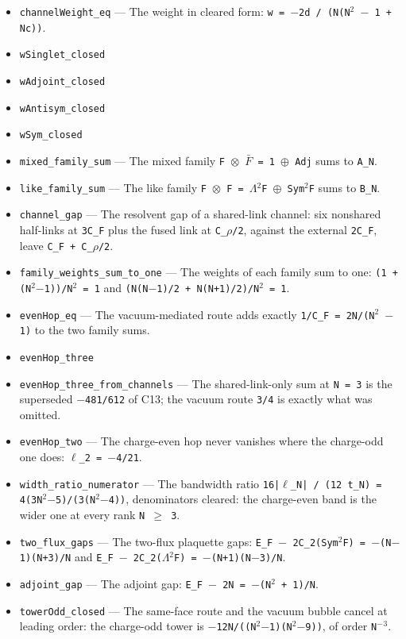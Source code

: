 \documentclass[11pt]{article}
\theoremstyle{plain}
\theoremstyle{definition}
\theoremstyle{remark}
\begin{document}
\begin{itemize}
\item \texttt{channelWeight\_eq} --- The weight in cleared form: \texttt{w = $-$2d / (N(N$^2$ $-$ 1 + Nc))}.
\item \texttt{wSinglet\_closed}
\item \texttt{wAdjoint\_closed}
\item \texttt{wAntisym\_closed}
\item \texttt{wSym\_closed}
\item \texttt{mixed\_family\_sum} --- The mixed family \texttt{F $\otimes$ $\bar F$ = 1 $\oplus$ Adj} sums to \texttt{A\_N}.
\item \texttt{like\_family\_sum} --- The like family \texttt{F $\otimes$ F = $\Lambda$$^2$F $\oplus$ Sym$^2$F} sums to \texttt{B\_N}.
\item \texttt{channel\_gap} --- The resolvent gap of a shared-link channel: six nonshared half-links at \texttt{3C\_F} plus the fused link at \texttt{C\_$\rho$/2}, against the external \texttt{2C\_F}, leave \texttt{C\_F + C\_$\rho$/2}.
\item \texttt{family\_weights\_sum\_to\_one} --- The weights of each family sum to one: \texttt{(1 + (N$^2$$-$1))/N$^2$ = 1} and \texttt{(N(N$-$1)/2 + N(N+1)/2)/N$^2$ = 1}.
\item \texttt{evenHop\_eq} --- The vacuum-mediated route adds exactly \texttt{1/C\_F = 2N/(N$^2$ $-$ 1)} to the two family sums.
\item \texttt{evenHop\_three}
\item \texttt{evenHop\_three\_from\_channels} --- The shared-link-only sum at \texttt{N = 3} is the superseded \texttt{$-$481/612} of C13; the vacuum route \texttt{3/4} is exactly what was omitted.
\item \texttt{evenHop\_two} --- The charge-even hop never vanishes where the charge-odd one does: \texttt{$\ell$\_2 = $-$4/21}.
\item \texttt{width\_ratio\_numerator} --- The bandwidth ratio \texttt{16|$\ell$\_N| / (12 t\_N) = 4(3N$^2$$-$5)/(3(N$^2$$-$4))}, denominators cleared: the charge-even band is the wider one at every rank \texttt{N $\ge$ 3}.
\item \texttt{two\_flux\_gaps} --- The two-flux plaquette gaps: \texttt{E\_F $-$ 2C\_2(Sym$^2$F) = $-$(N$-$1)(N+3)/N} and \texttt{E\_F $-$ 2C\_2($\Lambda$$^2$F) = $-$(N+1)(N$-$3)/N}.
\item \texttt{adjoint\_gap} --- The adjoint gap: \texttt{E\_F $-$ 2N = $-$(N$^2$ + 1)/N}.
\item \texttt{towerOdd\_closed} --- The same-face route and the vacuum bubble cancel at leading order: the charge-odd tower is \texttt{$-$12N/((N$^2$$-$1)(N$^2$$-$9))}, of order \texttt{N$^-$$^3$}.

\end{itemize}
\end{document}
